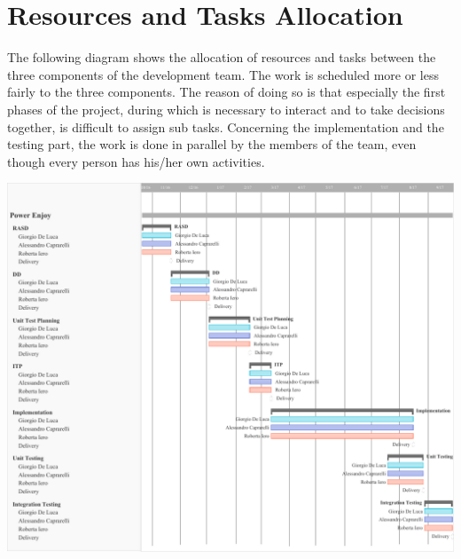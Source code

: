 \chapter{Resources and Tasks Allocation}
The following diagram shows the allocation of resources and tasks between the three components of the development team.
The work is scheduled more or less fairly to the three components.
The reason of doing so is that especially the first phases of the project, during which is necessary to interact and to take decisions together, is difficult to assign sub tasks.
Concerning the implementation and the testing part, the work is done in parallel by the members of the team, even though every person has his/her own activities.

\begin{minipage}{\textwidth}
\includegraphics[width=\linewidth, keepaspectratio]{../images/resource.pdf}
\end{minipage}
